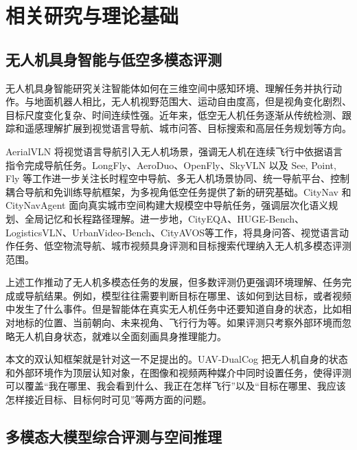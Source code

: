 
\chapter{相关研究与理论基础}

\section{无人机具身智能与低空多模态评测}

无人机具身智能研究关注智能体如何在三维空间中感知环境、理解任务并执行动作。与地面机器人相比，无人机视野范围大、运动自由度高，但是视角变化剧烈、目标尺度变化复杂、时间连续性强\cite{shao2025uavvln,wang2025embodiedintelligencesurvey,sun2025embodiedintelligentautonomousuav}。近年来，低空无人机任务逐渐从传统检测、跟踪和遥感理解扩展到视觉语言导航、城市问答、目标搜索和高层任务规划等方向。

AerialVLN 将视觉语言导航引入无人机场景，强调无人机在连续飞行中依据语言指令完成导航任务\cite{liu2023aerialvln}。LongFly、AeroDuo、OpenFly、SkyVLN 以及 See, Point, Fly 等工作进一步关注长时程空中导航、多无人机场景协同、统一导航平台、控制耦合导航和免训练导航框架，为多视角低空任务提供了新的研究基础\cite{jiang2025longfly,wu2025aeroduo,OpenFly,li2025skyvln,pmlr-v305-hu25e}。CityNav 和 CityNavAgent 面向真实城市空间构建大规模空中导航任务，强调层次化语义规划、全局记忆和长程路径理解\cite{lee2025citynav,zhang2025citynavagent}。进一步地，CityEQA、HUGE-Bench、LogisticsVLN、UrbanVideo-Bench、CityAVOS等工作，将具身问答、视觉语言动作任务、低空物流导航、城市视频具身评测和目标搜索代理纳入无人机多模态评测范围\cite{zhao2025cityeqa,guo2026huge,zhang2025logisticsvln,zhao2025urbanvideobench,ji2026towards}。

上述工作推动了无人机多模态任务的发展，但多数评测仍更强调环境理解、任务完成或导航结果。例如，模型往往需要判断目标在哪里、该如何到达目标，或者视频中发生了什么事件。但是智能体在真实无人机任务中还要知道自身的状态，比如相对地标的位置、当前朝向、未来视角、飞行行为等。如果评测只考察外部环境而忽略无人机自身状态，就难以全面刻画具身推理能力。

本文的双认知框架就是针对这一不足提出的。UAV-DualCog 把无人机自身的状态和外部环境作为顶层认知对象，在图像和视频两种媒介中同时设置任务，使得评测可以覆盖“我在哪里、我会看到什么、我正在怎样飞行”以及“目标在哪里、我应该怎样接近目标、目标何时可见”等两方面的问题。

\section{多模态大模型综合评测与空间推理}

